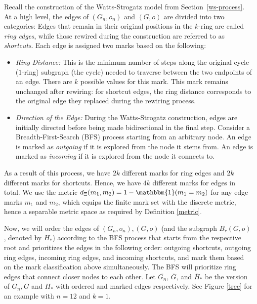 \documentclass[10pt]{amsart}
\begin{document}
Recall the construction of the Watts-Strogatz model from Section~\ref{ws-process}. At a high level, the edges of  $(G_n, o_n)$ and $(G, o)$ are divided into two categories: Edges that remain in their original positions in the $k$-ring  are called \emph{ring edges}, while those rewired during the construction are referred to as \emph{shortcuts}. Each edge is assigned two marks based on the following:
\begin{itemize}
    \item  \textit{Ring Distance:} This is the minimum number of steps along the original cycle ($1$-ring) subgraph (the cycle) needed to traverse between the two endpoints of an edge. There are $k$ possible values for this mark. This mark remains unchanged after rewiring: for shortcut edges, the ring distance corresponds to the original edge they replaced during the rewiring process.
    \item \textit{Direction of the Edge:} During the Watts-Strogatz construction, edges are initially directed before being made bidirectional in the final step. Consider a Breadth-First-Search (BFS) process starting from an arbitrary node. An edge is marked as \emph{outgoing} if it is explored from the node it stems from. An edge is marked as \emph{incoming} if it is explored from the node it connects to.
\end{itemize}

As a result of this process, we have $2k$ different marks for ring edges and $2k$ different marks for shortcuts. Hence, we have $4k$ different marks for edges in total.  We use the metric $d_\Xi(m_1, m_2) = 1-\mathbbm{1}(m_1 = m_2)$ for any edge marks $m_1$ and $m_2$, which equips the finite mark set with the discrete metric, hence a separable metric space as required by Definition \ref{metric}. 

Now, we will order the edges of $(G_n, o_n), (G, o)$ (and the subgraph $B_r(G,o)$, denoted by $H_*$) according to the BFS process that starts from the respective root and prioritizes the edges in the following order: outgoing shortcuts, outgoing ring edges, incoming ring edges, and incoming shortcuts, and mark them based on the mark classification above simultaneously. The BFS will prioritize ring edges that connect closer nodes to each other.  Let $\overline{G_n}$, $\overline{G}$, and $\overline{H}_*$ be the version of $G_n, G$ and $H_*$ with ordered and marked edges respectively. See Figure \ref{tree} for an example with $n=12$ and $k=1$.
\end{document}
